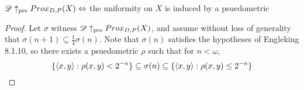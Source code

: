 \newpage

\begin{theorem}
  $\mathscr{D} \uparrow_{\text{pre}} Prox_{D,P}(X) \Leftrightarrow $ the uniformity on $X$ is induced by a psuedometric
\end{theorem}

\begin{proof}






  Let $\sigma$ witness $\mathscr{D} \uparrow_{\text{pre}} Prox_{D,P}(X)$, and assume without loss of generality that $\sigma(n+1)\subseteq\frac{1}{4}\sigma(n)$. Note that $\sigma(n)$ satisfies the hypotheses of Engleking 8.1.10, so there exists a psuedometric $\rho$ such that for $n<\omega$,
    \[
      \{\langle x,y\rangle:\rho(x,y)<2^{-n}\}\subseteq \sigma(n) \subseteq \{\langle x,y\rangle:\rho(x,y)\leq 2^{-n}\}
    \]


\end{proof}
